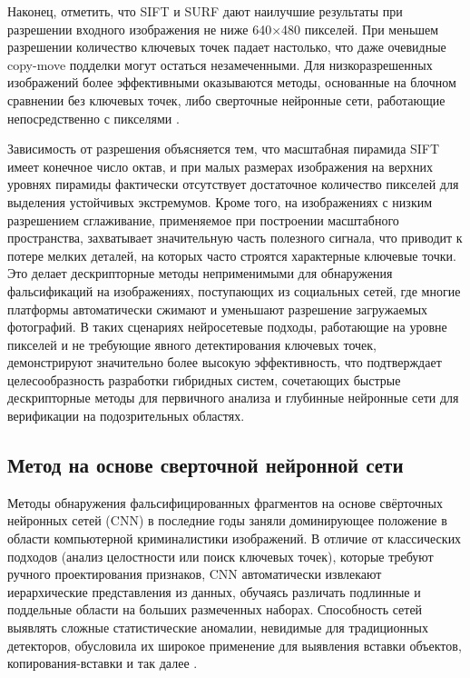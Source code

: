 Наконец, отметить, что SIFT и SURF дают наилучшие результаты при разрешении входного изображения не ниже 640×480 пикселей. При меньшем разрешении количество ключевых точек падает настолько, что даже очевидные copy-move подделки могут остаться незамеченными. Для низкоразрешенных изображений более эффективными оказываются методы, основанные на блочном сравнении без ключевых точек, либо сверточные нейронные сети, работающие непосредственно с пикселями \cite{11112}.

Зависимость от разрешения объясняется тем, что масштабная пирамида SIFT имеет конечное число октав, и при малых размерах изображения на верхних уровнях пирамиды фактически отсутствует достаточное количество пикселей для выделения устойчивых экстремумов. Кроме того, на изображениях с низким разрешением сглаживание, применяемое при построении масштабного пространства, захватывает значительную часть полезного сигнала, что приводит к потере мелких деталей, на которых часто строятся характерные ключевые точки. Это делает дескрипторные методы неприменимыми для обнаружения фальсификаций на изображениях, поступающих из социальных сетей, где многие платформы автоматически сжимают и уменьшают разрешение загружаемых фотографий. В таких сценариях нейросетевые подходы, работающие на уровне пикселей и не требующие явного детектирования ключевых точек, демонстрируют значительно более высокую эффективность, что подтверждает целесообразность разработки гибридных систем, сочетающих быстрые дескрипторные методы для первичного анализа и глубинные нейронные сети для верификации на подозрительных областях.

\subsection{Метод на основе сверточной нейронной сети}

Методы обнаружения фальсифицированных фрагментов на основе свёрточных нейронных сетей (CNN) в последние годы заняли доминирующее положение в области компьютерной криминалистики изображений. В отличие от классических подходов (анализ целостности или поиск ключевых точек), которые требуют ручного проектирования признаков, CNN автоматически извлекают иерархические представления из данных, обучаясь различать подлинные и поддельные области на больших размеченных наборах. Способность сетей выявлять сложные статистические аномалии, невидимые для традиционных детекторов, обусловила их широкое применение для выявления вставки объектов, копирования-вставки и так далее \cite{22}.

